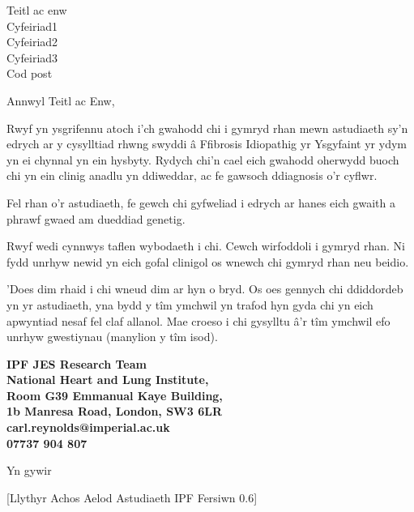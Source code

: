 \documentclass[ipfjes-centre-welsh,letterpaper,pagesize,UScommercial9]{scrlttr2}
\begin{document}
\begin{letter}{Teitl ac enw\\ Cyfeiriad1 \\ Cyfeiriad2 \\ Cyfeiriad3 \\ Cod post}


\opening{Annwyl Teitl ac Enw,}

     Rwyf yn ysgrifennu atoch i'ch gwahodd chi i gymryd rhan mewn astudiaeth sy'n edrych ar y cysylltiad rhwng swyddi \^{a} Ffibrosis Idiopathig yr Ysgyfaint yr ydym yn ei chynnal yn ein hysbyty. Rydych chi'n cael eich gwahodd oherwydd buoch chi yn ein clinig anadlu yn ddiweddar, ac fe gawsoch ddiagnosis o'r cyflwr.
     
     Fel rhan o'r astudiaeth, fe gewch chi gyfweliad i edrych ar hanes eich gwaith a phrawf gwaed am dueddiad genetig.
     
    Rwyf wedi cynnwys taflen wybodaeth i chi. Cewch wirfoddoli i gymryd rhan. Ni fydd unrhyw newid yn eich gofal clinigol os wnewch chi gymryd rhan neu beidio. 
    
    'Does dim rhaid i chi wneud dim ar hyn o bryd. Os oes gennych chi ddiddordeb yn yr astudiaeth, yna bydd y t\^{i}m ymchwil yn trafod hyn gyda chi yn eich apwyntiad nesaf fel claf allanol.
     Mae croeso i chi gysylltu \^{a}'r t\^{i}m ymchwil efo unrhyw gwestiynau (manylion y t\^{i}m isod). 

    \vspace{1cm}
    \begin{centering}
    \textbf{
    IPF JES Research Team \\  
    National Heart and Lung Institute, \\
    Room G39 Emmanual Kaye Building, \\
    1b Manresa Road, London, SW3 6LR\\
    carl.reynolds@imperial.ac.uk \\
    07737 904 807 \\
    }
    \end{centering}
    \vspace{1cm}

\closing{Yn gywir}

     \vfill \hfill [Llythyr Achos Aelod Astudiaeth IPF Fersiwn 0.6]


\end{letter}
\end{document}

